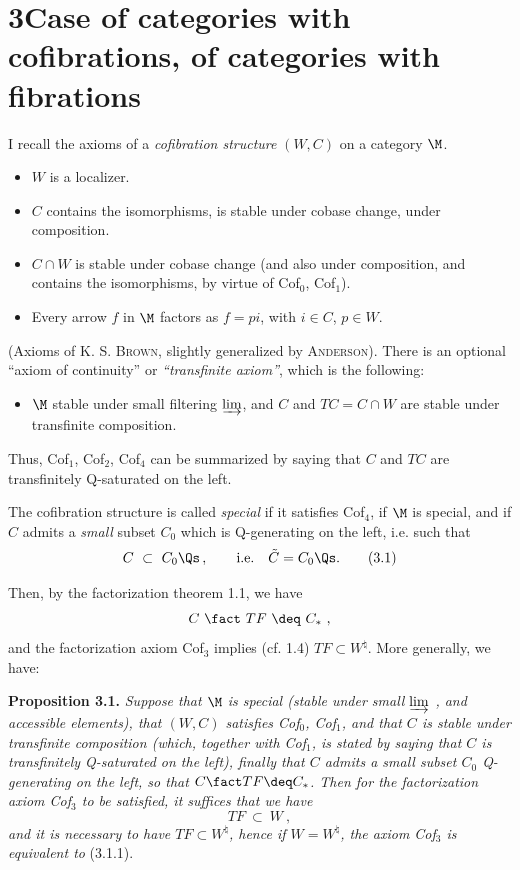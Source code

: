 
\section*{3\quad Case of categories with cofibrations, of categories with fibrations}

I recall the axioms of a \textit{cofibration structure} $(W,C)$ on a category $\M$.

\begin{itemize}[leftmargin=4em,labelwidth=3.5em,align=left]
\item[Cof$_0$ :] $W$ is a localizer.
\item[Cof$_1$ :] $C$ contains the isomorphisms, is stable under cobase change, under composition.
\item[Cof$_2$ :] $C\cap W$ is stable under cobase change (and also under composition, and contains the isomorphisms, by virtue of Cof$_0$, Cof$_1$).
\item[Cof$_3$ :] Every arrow $f$ in $\M$ factors as $f=pi$, with $i\in C$, $p\in W$.
\end{itemize}

(Axioms of K. S. \textsc{Brown}, slightly generalized by \textsc{Anderson}). There is an optional ``axiom
of continuity'' or \textit{``transfinite axiom''}, which is the following:

\begin{itemize}[leftmargin=4em,labelwidth=3.5em,align=left]
\item[Cof$_4$ :] $\M$ stable under small filtering $\varinjlim$, and $C$ and $TC = C\cap W$ are stable under transfinite composition.
\end{itemize}

Thus, Cof$_1$, Cof$_2$, Cof$_4$ can be summarized by saying that $C$ and $TC$ are transfinitely Q-saturated on the left.

The cofibration structure is called \textit{special} if it satisfies Cof$_4$, if $\M$ is special, and if $C$ admits a \textit{small} subset $C_0$ which is Q-generating on the left, i.e. such that
\[
C \ \subset\ C_0\Qs\,, \qquad \text{i.e.}\quad \tilde{C}=C_0\Qs. \tag*{(3.1)}
\]

Then, by the factorization theorem 1.1, we have
\[
C \ \fact\ TF \ \deq\ C_* \ ,
\]
and the factorization axiom Cof$_3$ implies (cf. 1.4) $TF\subset W^{\natural}$. More generally, we have:

\textbf{Proposition 3.1.} \textit{Suppose that $\M$ is special (stable under small $\varinjlim$ , and accessible elements), that $(W,C)$ satisfies Cof$_0$, Cof$_1$, and that $C$ is stable under transfinite composition (which, together with Cof$_1$, is stated by saying that $C$ is transfinitely Q-saturated on the left), finally that $C$ admits a small subset $C_0$ Q-generating on the left, so that $C\fact TF\deq C_*$. Then for the factorization axiom Cof$_3$ to be satisfied, it suffices that we have}
\[
TF \ \subset\ W \ , \tag*{(3.1.1)}
\]
\textit{and it is necessary to have $TF\subset W^{\natural}$, hence if $W=W^{\natural}$, the axiom Cof$_3$ is equivalent to} (3.1.1).

